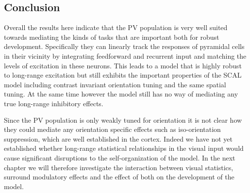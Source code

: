 \subsection{Conclusion}

Overall the results here indicate that the PV population is very well
suited towards mediating the kinds of tasks that are important both
for robust development. Specifically they can linearly track the
responses of pyramidal cells in their vicinity by integrating
feedforward and recurrent input and matching the levels of excitation
in these neurons. This leads to a model that is highly robust to
long-range excitation but still exhibits the important properties of
the SCAL model including contrast invariant orientation tuning and the
same spatial tuning. At the same time however the model still has no
way of mediating any true long-range inhibitory effects.

Since the PV population is only weakly tuned for orientation it is not
clear how they could mediate any orientation specific effects such as
iso-orientation suppression, which are well established in the
cortex. Indeed we have not yet established whether long-range
statistical relationships in the visual input would cause significant
disruptions to the self-organization of the model. In the next chapter
we will therefore investigate the interaction between visual
statistics, surround modulatory effects and the effect of both on the
development of the model.
